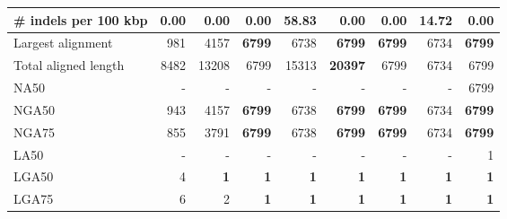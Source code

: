 \documentclass[12pt,a4paper]{article}
\begin{document}
\begin{table}[ht]
\begin{center}
\begin{tabular}{|l*{8}{|r}|}
\# indels per 100 kbp & {\bf 0.00} & {\bf 0.00} & {\bf 0.00} & 58.83 & {\bf 0.00} & {\bf 0.00} & 14.72 & {\bf 0.00} \\ \hline
Largest alignment & 981 & 4157 & {\bf 6799} & 6738 & {\bf 6799} & {\bf 6799} & 6734 & {\bf 6799} \\ \hline
Total aligned length & 8482 & 13208 & 6799 & 15313 & {\bf 20397} & 6799 & 6734 & 6799 \\ \hline
NA50 & - & - & - & - & - & - & - & 6799 \\ \hline
NGA50 & 943 & 4157 & {\bf 6799} & 6738 & {\bf 6799} & {\bf 6799} & 6734 & {\bf 6799} \\ \hline
NGA75 & 855 & 3791 & {\bf 6799} & 6738 & {\bf 6799} & {\bf 6799} & 6734 & {\bf 6799} \\ \hline
LA50 & - & - & - & - & - & - & - & 1 \\ \hline
LGA50 & 4 & {\bf 1} & {\bf 1} & {\bf 1} & {\bf 1} & {\bf 1} & {\bf 1} & {\bf 1} \\ \hline
LGA75 & 6 & 2 & {\bf 1} & {\bf 1} & {\bf 1} & {\bf 1} & {\bf 1} & {\bf 1} \\ \hline
\end{tabular}
\end{center}
\end{table}
\end{document}
